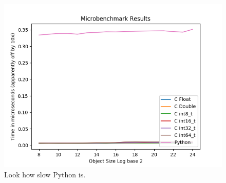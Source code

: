 \documentclass[12pt]{article}
\begin{document}
\begin{figure}
\centering
\includegraphics[width=\linewidth]{All_Results.png}
\caption{Look how slow Python is.}
\end{figure}
\end{document}
